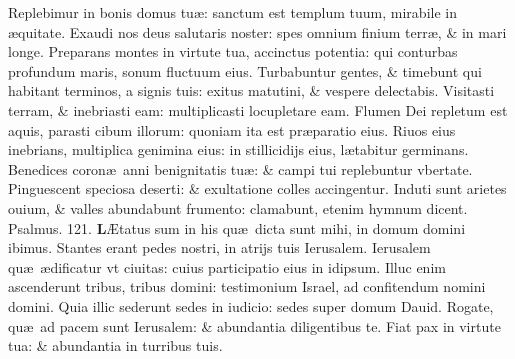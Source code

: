 \documentclass[a5paper,10pt]{book}
\def\ae{æ}
\def\AE{Æ}
\begin{document}
\begin{multicols*}{2}
\newline \color{red} R\color{black}eplebimur in bonis domus tu\ae : sanctum est templum tuum, mirabile in \ae quitate.
\newline \color{red} E\color{black}xaudi nos deus salutaris noster: spes omnium finium terr\ae , \& in mari longe.
\newline \color{red} P\color{black}reparans montes in virtute tua, accinctus potentia: qui conturbas profundum maris, sonum fluctuum eius.
\newline \color{red} T\color{black}urbabuntur gentes, \& timebunt qui habitant terminos, a signis tuis: exitus matutini, \& vespere delectabis.
\newline \color{red} V\color{black}isitasti terram, \& inebriasti eam: multiplicasti locupletare eam.
\newline \color{red} F\color{black}lumen Dei repletum est aquis, parasti cibum illorum: quoniam ita est pr\ae paratio eius.
\newline \color{red} R\color{black}iuos eius inebrians, multiplica genimina eius: in stillicidijs eius, l\ae tabitur germinans.%
\newline \color{red} B\color{black}enedices coron\ae \ anni benignitatis tu\ae : \& campi tui replebuntur vbertate.
\newline \color{red} P\color{black}inguescent speciosa deserti: \& exultatione colles accingentur.
\newline \color{red} I\color{black}nduti sunt arietes ouium, \& valles abundabunt frumento: clamabunt, etenim hymnum dicent. \color{red} Psalmus. 121. \color{black}
\vspace{-1.25em}
\lettrine[lines=2]{\bfseries \color{red} L}{}\AE tatus sum in his qu\ae \ dicta sunt mihi, in domum domini ibimus.
\newline \color{red} S\color{black}tantes erant pedes nostri, in atrijs tuis Ierusalem.
\newline \color{red} I\color{black}erusalem qu\ae \ \ae dificatur vt ciuitas: cuius participatio eius in idipsum.
\newline \color{red} I\color{black}lluc enim ascenderunt tribus, tribus domini: testimonium Israel, ad confitendum nomini domini.
\newline \color{red} Q\color{black}uia illic sederunt sedes in iudicio: sedes super domum Dauid.
\newline \color{red} R\color{black}ogate, qu\ae \ ad pacem sunt Ierusalem: \& abundantia diligentibus te.
\newline \color{red} F\color{black}iat pax in virtute tua: \& abundantia in turribus tuis.

\end{multicols*}
\end{document}
